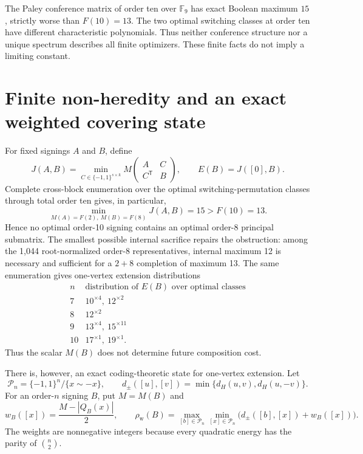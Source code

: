 \documentclass[11pt]{article}
\newcommand{\eps}{\{-1,1\}}
\begin{document}
The Paley conference matrix of order ten over \(\mathbb F_9\) has exact
Boolean maximum \(15\), strictly worse than \(F(10)=13\).  The two optimal
switching classes at order ten have different characteristic polynomials.
Thus neither conference structure nor a unique spectrum describes all finite
optimizers.  These finite facts do not imply a limiting constant.

\section{Finite non-heredity and an exact weighted covering state}

For fixed signings $A$ and $B$, define
\[
 J(A,B)=\min_{C\in\eps^{s\times k}}
 M\begin{pmatrix}A&C\\C^{\mathsf T}&B\end{pmatrix},
 \qquad E(B)=J([0],B).
\]
Complete cross-block enumeration over the optimal switching-permutation
classes through total order ten gives, in particular,
\begin{equation}
 \min_{M(A)=F(2),\ M(B)=F(8)}J(A,B)=15>F(10)=13.
 \label{eq:twoeight}
\end{equation}
Hence no optimal order-10 signing contains an optimal order-8 principal
submatrix.  The smallest possible internal sacrifice repairs the obstruction:
among the 1,044 root-normalized order-8 representatives, internal maximum 12
is necessary and sufficient for a $2+8$ completion of maximum 13.  The same
enumeration gives one-vertex extension distributions
\[
\begin{array}{c|c}
n&\text{distribution of $E(B)$ over optimal classes}\\ \hline
7&10^{\times4},\ 12^{\times2}\\
8&12^{\times2}\\
9&13^{\times4},\ 15^{\times11}\\
10&17^{\times1},\ 19^{\times1}.
\end{array}
\]
Thus the scalar $M(B)$ does not determine future composition cost.

There is, however, an exact coding-theoretic state for one-vertex extension.
Let
\[
 \mathcal P_n=\eps^n/\{x\sim-x\},\qquad
 d_\pm([u],[v])=\min\{d_H(u,v),d_H(u,-v)\}.
\]
For an order-$n$ signing $B$, put $M=M(B)$ and
\[
 w_B([x])=\frac{M-|Q_B(x)|}{2},
 \qquad
 \rho_{\mathrm w}(B)=
 \max_{[b]\in\mathcal P_n}\min_{[x]\in\mathcal P_n}
 \bigl(d_\pm([b],[x])+w_B([x])\bigr).
\]
The weights are nonnegative integers because every quadratic energy has the
parity of $\binom n2$.
\end{document}
